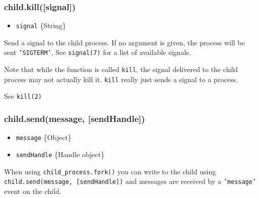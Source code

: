 \subsubsection{child.kill({[}signal{]})}

\begin{itemize}
\item
  \texttt{signal} \{String\}
\end{itemize}

Send a signal to the child process. If no argument is given, the process
will be sent \texttt{'SIGTERM'}. See \texttt{signal(7)} for a list of
available signals.

\begin{Shaded}
\begin{Highlighting}[]
 \NormalTok{,}
    \NormalTok{, [}\NormalTok{]);}

\NormalTok{(}\NormalTok{, } 
  \NormalTok{(}
\NormalTok{\});}

\NormalTok{(}\NormalTok{);}
\end{Highlighting}
\end{Shaded}

Note that while the function is called \texttt{kill}, the signal
delivered to the child process may not actually kill it. \texttt{kill}
really just sends a signal to a process.

See \texttt{kill(2)}

\subsubsection{child.send(message, {[}sendHandle{]})}

\begin{itemize}
\item
  \texttt{message} \{Object\}
\item
  \texttt{sendHandle} \{Handle object\}
\end{itemize}

When using \texttt{child\_process.fork()} you can write to the child
using \texttt{child.send(message, {[}sendHandle{]})} and messages are
received by a \texttt{'message'} event on the child.

